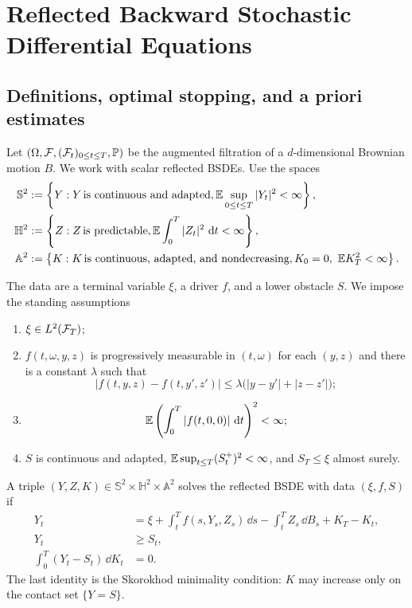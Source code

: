 \chapter[Reflected BSDEs]{Reflected Backward Stochastic Differential Equations}

\section{Definitions, optimal stopping, and a priori estimates}

Let $(\Omega,\mathcal F,(\mathcal F_t)_{0\leq t\leq T},\mathbb P)$ be the augmented filtration of
a $d$-dimensional Brownian motion $B$. We work with scalar reflected BSDEs.
Use the spaces
\begin{align*}
  \mathbb{S}^2
  &:=\left\{Y:Y\,\mbox{is continuous and adapted},
       \mathbb E\sup_{0\leq t\leq T}|Y_t|^2<\infty\right\},\\
  \mathbb{H}^2
  &:=\left\{Z:Z\,\mbox{is predictable},
       \mathbb E\int_0^T|Z_t|^2\,\mathop{}\!\mathrm d t<\infty\right\},\\
  \mathbb{A}^2
  &:=\left\{K:K\,\mbox{is continuous, adapted, and nondecreasing},
       K_0=0,\ \mathbb E K_T^2<\infty\right\}.
\end{align*}

The data are a terminal variable $\xi$, a driver $f$, and a lower obstacle
$S$. We impose the standing assumptions
\begin{enumerate}[label=(A\arabic*)]
  \item $\xi\in L^2(\mathcal F_T)$;
  \item $f(t,\omega,y,z)$ is progressively measurable in $(t,\omega)$ for
        each $(y,z)$ and there is a constant $\lambda$ such that
  \[
    |f(t,y,z)-f(t,y',z')|
    \leq\lambda\bigl(|y-y'|+|z-z'|\bigr);
  \]
  \item
  \[
    \mathbb E\left(\int_0^T|f(t,0,0)|\,\mathop{}\!\mathrm d t\right)^2<\infty;
  \]
  \item $S$ is continuous and adapted,
  $\mathbb E\sup_{t\leq T}(S_t^+)^2<\infty$, and $S_T\leq\xi$ almost surely.
\end{enumerate}
\begin{definition}
A triple $(Y,Z,K)\in\mathbb{S}^2\times\mathbb{H}^2\times\mathbb{A}^2$ solves
the reflected BSDE with data $(\xi,f,S)$ if
\begin{align}
  Y_t
  &=\xi+\int_t^T f(s,Y_s,Z_s)\,\dd s
      -\int_t^T Z_s\,\dd B_s+K_T-K_t, \label{eq:rbsde-main}\\
  Y_t&\geq S_t, \label{eq:rbsde-obstacle}\\
  \int_0^T(Y_t-S_t)\,\dd K_t&=0. \label{eq:rbsde-skorokhod}
\end{align}
The last identity is the Skorokhod minimality condition: $K$ may increase
only on the contact set $\{Y=S\}$.
\end{definition}

